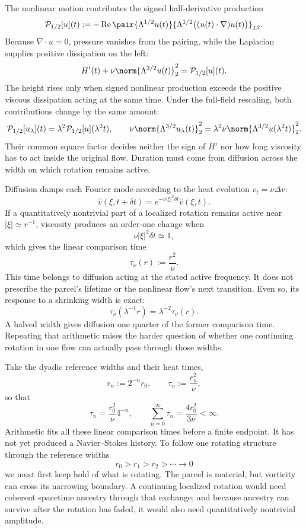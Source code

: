 
The nonlinear motion contributes the signed half-derivative production
\[
  \mathcal P_{1/2}[u](t)
  :=
  -\operatorname{Re}
  \pair
    {\Lambda^{1/2}u(t)}
    {\Lambda^{1/2}\bigl((u(t)\cdot\nabla)u(t)\bigr)}_{L^2}.
\]
Because \(\nabla\cdot u=0\), pressure vanishes from the pairing, while the Laplacian supplies positive dissipation on the left:
\[
  H'(t)
  +
  \nu\norm{\Lambda^{3/2}u(t)}_2^2
  =
  \mathcal P_{1/2}[u](t).
\]
The height rises only when signed nonlinear production exceeds the positive viscous dissipation acting at the same time. Under the full-field rescaling, both contributions change by the same amount:
\[
  \mathcal P_{1/2}[u_\lambda](t)
  =
  \lambda^2\mathcal P_{1/2}[u](\lambda^2t),
  \qquad
  \nu\norm{\Lambda^{3/2}u_\lambda(t)}_2^2
  =
  \lambda^2\nu\norm{\Lambda^{3/2}u(\lambda^2t)}_2^2.
\]
Their common square factor decides neither the sign of \(H'\) nor how long viscosity has to act inside the original flow. Duration must come from diffusion across the width on which rotation remains active.


Diffusion damps each Fourier mode according to the heat evolution \(v_t=\nu\Delta v\):
\[
  \widehat v(\xi,t+\delta t)
  =
  e^{-\nu|\xi|^2\delta t}\widehat v(\xi,t).
\]
If a quantitatively nontrivial part of a localized rotation remains active near \(|\xi|\simeq r^{-1}\), viscosity produces an order-one change when
\[
  \nu|\xi|^2\delta t\simeq1,
\]
which gives the linear comparison time
\[
  \tau_\nu(r)
  :=
  \frac{r^2}{\nu}.
\]
This time belongs to diffusion acting at the stated active frequency. It does not prescribe the parcel's lifetime or the nonlinear flow's next transition. Even so, its response to a shrinking width is exact:
\[
  \tau_\nu(\lambda^{-1}r)
  =
  \lambda^{-2}\tau_\nu(r).
\]
A halved width gives diffusion one quarter of the former comparison time. Repeating that arithmetic raises the harder question of whether one continuing rotation in one flow can actually pass through those widths.


Take the dyadic reference widths and their heat times,
\[
  r_n:=2^{-n}r_0,
  \qquad
  \tau_n:=\frac{r_n^2}{\nu},
\]
so that
\[
  \tau_n
  =
  \frac{r_0^2}{\nu}4^{-n},
  \qquad
  \sum_{n=0}^{\infty}\tau_n
  =
  \frac{4r_0^2}{3\nu}
  <
  \infty.
\]
Arithmetic fits all these linear comparison times before a finite endpoint. It has not yet produced a Navier--Stokes history. To follow one rotating structure through the reference widths
\[
  r_0>r_1>r_2>\cdots\longrightarrow0
\]
we must first keep hold of what is rotating. The parcel is material, but vorticity can cross its narrowing boundary. A continuing localized rotation would need coherent spacetime ancestry through that exchange; and because ancestry can survive after the rotation has faded, it would also need quantitatively nontrivial amplitude.

